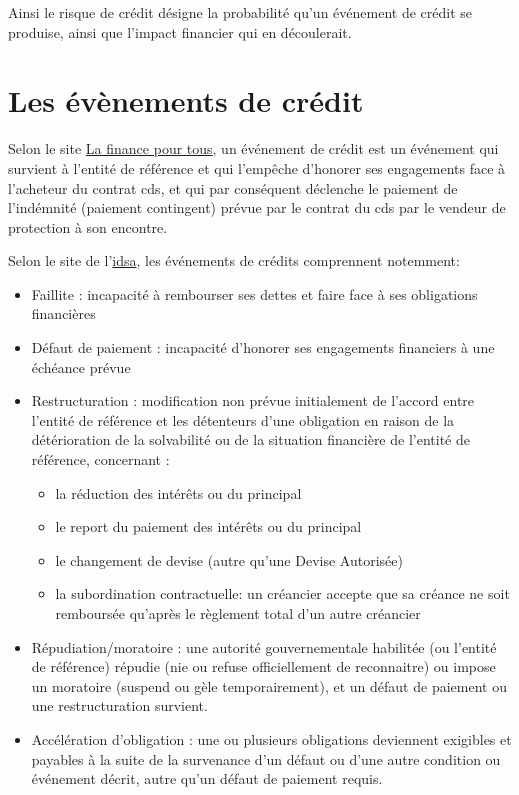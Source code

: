 Ainsi le risque de crédit désigne la probabilité qu'un événement de crédit se produise, ainsi que l'impact financier qui en découlerait.


\section{Les évènements de crédit}

\begin{definition}\label{def:evenement_credit}

Selon le site \href{https://www.lafinancepourtous.com/outils/dictionnaire/evenement-de-credit/}{La finance pour tous}, un événement de crédit est un événement qui survient à l'entité de référence et qui l'empêche d'honorer ses engagements face à l'acheteur du contrat \gls{cds}, et qui par conséquent déclenche le paiement de l'indémnité (paiement contingent) prévue par le contrat du \gls{cds} par le vendeur de protection à son encontre.

Selon le site de l'\href{https://www.isda.org/}{\gls{idsa}}, les événements de crédits comprennent notemment:
\begin{itemize}
    \item Faillite : incapacité à rembourser ses dettes et faire face à ses obligations financières
    \item Défaut de paiement : incapacité d'honorer ses engagements financiers à une échéance prévue
    \item Restructuration : modification non prévue initialement de l'accord entre l'entité de référence et les détenteurs d'une obligation en raison de la détérioration de la solvabilité ou de la situation financière de l'entité de référence, concernant :
    \begin{itemize}
        \item la réduction des intérêts ou du principal
        \item le report du paiement des intérêts ou du principal
        \item le changement de devise (autre qu'une Devise Autorisée)
        \item la subordination contractuelle: un créancier accepte que sa créance ne soit remboursée qu'après le règlement total d'un autre créancier
    \end{itemize}
    \item Répudiation/moratoire : une autorité gouvernementale habilitée (ou l'entité de référence) répudie (nie ou refuse officiellement de reconnaitre) ou impose un moratoire (suspend ou gèle temporairement), et un défaut de paiement ou une restructuration survient.
    \item Accélération d'obligation : une ou plusieurs obligations deviennent exigibles et payables à la suite de la survenance d'un défaut ou d'une autre condition ou événement décrit, autre qu'un défaut de paiement requis.
\end{itemize}
\end{definition}


